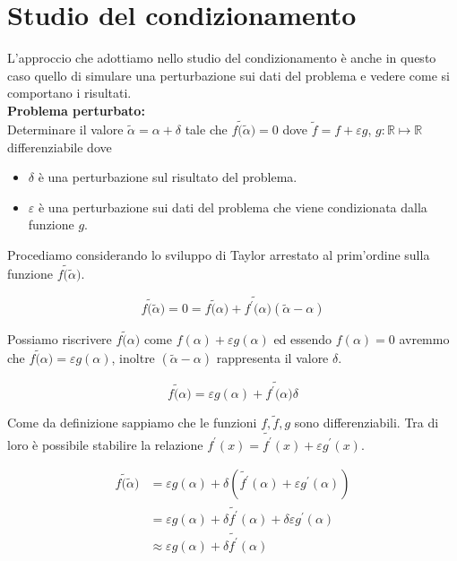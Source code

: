 \documentclass[12pt, a4paper]{book}
\theoremstyle{definition}
\begin{document}
\section{Studio del condizionamento}
\begin{flushleft}
L'approccio che adottiamo nello studio del condizionamento è anche in questo caso quello di simulare una perturbazione sui dati del problema e vedere come si comportano i risultati.\\
\vspace{1em}
\textbf{Problema perturbato:}\\
Determinare il valore $\tilde{\alpha} = \alpha + \delta$ tale che $\tilde{f(\tilde{\alpha}}) = 0$ dove $\tilde{f} = f + \varepsilon g$,  $g: \mathbb{R} \mapsto \mathbb{R} $ differenziabile dove
\begin{itemize}
	\item $\delta$ è una perturbazione sul risultato del problema.
	\item $\varepsilon$ è una perturbazione sui dati del problema che viene condizionata dalla funzione $g$.
\end{itemize}
\vspace{1em}
Procediamo considerando lo sviluppo di Taylor arrestato al prim'ordine sulla funzione $\tilde{f(\tilde{\alpha}})$.

\begin{equation}
	\tilde{f(\tilde{\alpha}}) = 0 = \tilde{f(\alpha}) + \tilde{f^{'}(\alpha})(\tilde{\alpha} - \alpha)
\end{equation}

Possiamo riscrivere $\tilde{f(\alpha})$ come $f(\alpha) + \varepsilon g(\alpha)$ ed essendo $f(\alpha) = 0$ avremmo che $\tilde{f(\alpha}) =  \varepsilon g(\alpha)$, inoltre $(\tilde{\alpha} - \alpha)$ rappresenta il valore $\delta$.

\begin{equation}
	\tilde{f(\alpha}) = \varepsilon g(\alpha) + \tilde{f^{'}(\alpha})\delta
\end{equation}

Come da definizione sappiamo che le funzioni $f, \tilde{f}, g$ sono differenziabili.  Tra di loro è possibile stabilire la relazione  $f^{'}(x) = \tilde{f^{'}}(x) + \varepsilon g^{'}(x)$.

\begin{equation}
	\begin{split}
		\tilde{f(\tilde{\alpha}}) &= \varepsilon g(\alpha) + \delta (\tilde{f^{'}}(\alpha) + \varepsilon g^{'}(\alpha)) \\
										  &= \varepsilon g(\alpha) + \delta \tilde{f^{'}}(\alpha) + \delta \varepsilon g^{'}(\alpha) \\
										  & \approx \varepsilon g(\alpha) + \delta \tilde{f^{'}}(\alpha)
	\end{split}
\end{equation}
 

\end{flushleft}
\end{document}
